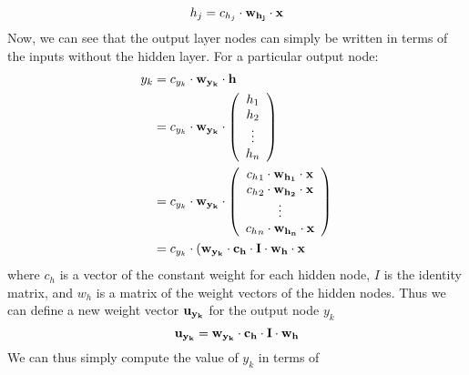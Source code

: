 \documentclass{article}
\begin{document}
\begin{enumerate}
\begin{enumerate}
\begin{equation*}
                    h_j= c_{h_j} \cdot \bf{w_{h_j}} \cdot \bf{x}
                \end{equation*}
                Now, we can see that the output layer nodes can simply be 
                written in terms of the inputs without the hidden layer.
                For a particular output node:
                \begin{align*}
                    y_k
                        &= c_{y_k} \cdot \bf{w_{y_k}} \cdot \bf{h} \\
                        &= c_{y_k} \cdot \bf{w_{y_k}} \cdot
                            \left( \begin{array}{c}
                            h_1 \\
                            h_2 \\
                            \vdots \\
                            h_n 
                            \end{array} \right) \\
                        &= c_{y_k} \cdot \bf{w_{y_k}} \cdot 
                            \left( \begin{array}{c}
                            {c_h}_1 \cdot \bf{w_{h_1}} \cdot \bf{x} \\
                            {c_h}_2 \cdot \bf{w_{h_2}} \cdot \bf{x} \\
                            \vdots \\
                            {c_h}_n \cdot \bf{w_{h_n}} \cdot \bf{x}
                            \end{array} \right) \\
                        &= c_{y_k} \cdot (\bf{w_{y_k}} \cdot \bf{c_h} \cdot
                            I \cdot \bf{w_h} \cdot \bf{x}
                \end{align*}
                where \(c_h\) is a vector of the constant weight for each
                hidden node, \(I\) is the identity matrix, and \(w_h\) is
                a matrix of the weight vectors of the hidden nodes.
                Thus we can define a new weight vector \(\bf{u_{y_k}}\) for
                the output node \(y_k\)
                \begin{equation*}
                    {\bf{u_{y_k}}}= \bf{w_{y_k}} \cdot \bf{c_h} \cdot \bf{I}
                    \cdot \bf{w_h}
                \end{equation*}
                We can thus simply compute the value of \(y_k\) in terms of

\end{enumerate}
\end{enumerate}
\end{document}
